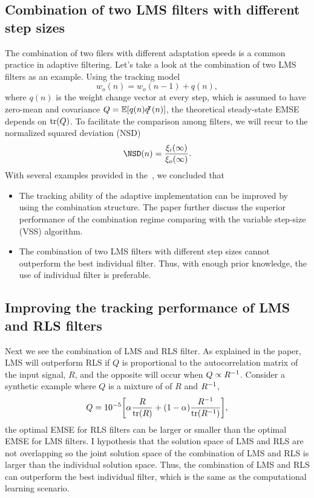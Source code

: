 \documentclass[11pt]{article}
\begin{document}
\subsection{Combination of two LMS filters with different step sizes}
The combination of two filers with different adaptation speeds is a common practice in adaptive filtering. Let's take a look at the combination of two LMS filters as an example. 
Using the tracking model
\begin{equation}
    w_o(n)=w_o(n-1)+q(n),
\end{equation}
where $q(n)$ is the weight change vector at every step, which is assumed to have zero-mean and covariance $Q=\E{q(n)q\trn(n)}$, the theoretical steady-state EMSE depends on $\operatorname{\mathrm{tr}}(Q)$. To facilitate the comparison among filters, we will recur to the normalized squared deviation (NSD)
\begin{equation}
    \NSD(n)=\frac{\xi_i(\infty)}{\xi_o(\infty)}.
\end{equation}
With several examples provided in the~\cite{Arenas_Garcia_2016}, we concluded that
\begin{itemize}
    \item The tracking ability of the adaptive implementation can be improved by using the combination structure. The paper further discuss the superior performance of the combination regime comparing with the variable step-size (VSS) algorithm.
    \item The combination of two LMS filters with different step sizes cannot outperform the best individual filter. Thus, with enough prior knowledge, the use of individual filter is preferable.
\end{itemize}

\subsection{Improving the tracking performance of LMS and RLS filters}
Next we see the combination of LMS and RLS filter. As explained in the paper, LMS will outperform RLS if $Q$ is proportional to the autocorrelation matrix of the input signal, $R$, and the opposite will occur when $Q \propto R^{-1}$. Consider a synthetic example where $Q$ is a mixture of of $R$ and $R^{-1}$,
\begin{equation}
    Q=10^{-5}\bracks*{\alpha\frac{R}{\tr(R)}+(1-\alpha)\frac{R\inv}{\tr(R\inv)}},
\end{equation}
the optimal EMSE for RLS filters can be larger or smaller than the optimal EMSE for LMS filters. I hypothesis that the solution space of LMS and RLS are not overlapping so the joint solution space of the combination of LMS and RLS is larger than the individual solution space. Thus, the combination of LMS and RLS can outperform the best individual filter, which is the same as the computational learning scenario.
\end{document}
